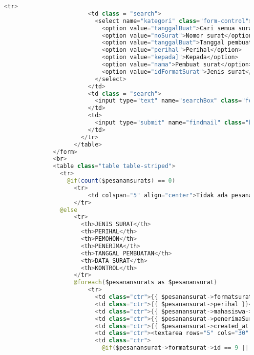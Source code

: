 \begin{lstlisting}[language=Java,basicstyle=\tiny,caption=\textit{Home} pejabat]
                      <tr>
                        <td class = "search">
                          <select name="kategori" class="form-control">
                            <option value="tanggalBuat">Cari semua surat</option>
                            <option value="noSurat">Nomor surat</option>
                            <option value="tanggalBuat">Tanggal pembuatan</option>
                            <option value="perihal">Perihal</option>
                            <option value="kepada]">Kepada</option>
                            <option value="nama">Pembuat surat</option>
                            <option value="idFormatSurat">Jenis surat</option>
                          </select>
                        </td>
                        <td class = "search">
                          <input type="text" name="searchBox" class="form-control" size="68" />
                        </td>
                        <td>
                          <input type="submit" name="findmail" class="btn btn-primary" value="Cari surat" />
                        </td>
                      </tr>
                    </table>
              </form>
              <br>
              <table class="table table-striped">
                <tr>
                  @if(count($pesanansurats) == 0)
                    <tr>
                        <td colspan="5" align="center">Tidak ada pesanan surat ...</td>
                    </tr>
                @else
                    <tr>
                      <th>JENIS SURAT</th>
                      <th>PERIHAL</th>
                      <th>PEMOHON</th>
                      <th>PENERIMA</th>
                      <th>TANGGAL PEMBUATAN</th>
                      <th>DATA SURAT</th>
                      <th>KONTROL</th>
                    </tr>
                    @foreach($pesanansurats as $pesanansurat)
                        <tr>
                          <td class="ctr">{{ $pesanansurat->formatsurat->jenis_surat }}</td>
                          <td class="ctr">{{ $pesanansurat->perihal }}</td>
                          <td class="ctr">{{ $pesanansurat->mahasiswa->nama_mahasiswa }}</td>
                          <td class="ctr">{{ $pesanansurat->penerimaSurat }}</td>
                          <td class="ctr">{{ $pesanansurat->created_at }}</td>
                          <td class="ctr"><textarea rows="5" cols="30" style="border: none" readonly>{{ $pesanansurat->dataSurat }}</textarea></td>
                          <td class="ctr">
                            @if($pesanansurat->formatsurat->id == 9 || $pesanansurat->formatsurat->id == 10)

\end{lstlisting}
